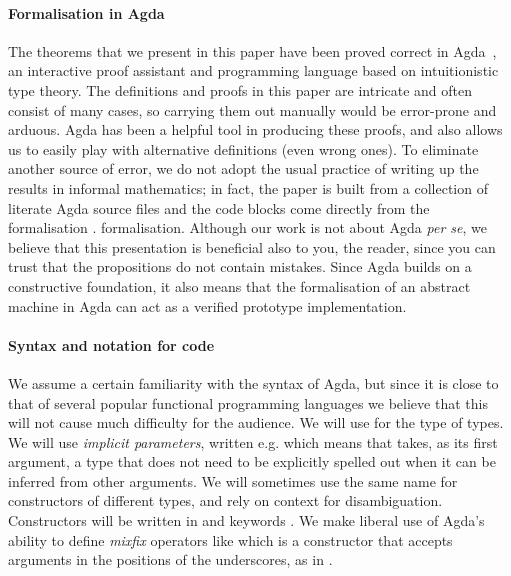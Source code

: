 \documentclass{article}
\theoremstyle{definition}
\newcommand{\Conid}[1]{\mathit{#1}}
\newcommand{\Varid}[1]{\mathit{#1}}
\renewcommand\Varid[1]{\mathord{\textsf{#1}}}
\let\Conid\Varid
\newcommand\MyConid[1]{\mathord{\textsf{\textbf{#1}}}}
\renewcommand\Varid[1]{\textsf{#1}}
\newcommand{\dummy}{\Varid{\_}}
\begin{document}
\paragraph*{Formalisation in Agda}
The theorems that we present in this paper have been proved correct in
Agda~\cite{norell:thesis}, an interactive proof assistant and programming
language based on intuitionistic type theory.  The definitions and proofs in
this paper are intricate and often consist of many cases, so carrying them out manually would
be error-prone and arduous.  Agda has been a helpful tool in producing these
proofs, and also allows us to easily play with alternative definitions (even wrong
ones). To eliminate another source of error, we do not adopt the usual practice
of writing up the results in informal mathematics; in fact, the paper is built
from a collection of literate Agda source files and the code blocks come
directly from the
\ifnotfullversion
formalisation \cite{SourceCode}.
\else
formalisation.
\fi
Although our work is not
about Agda \emph{per se}, we believe that this presentation is beneficial also
to you, the reader, since you can trust that the propositions do not contain
mistakes.
Since Agda builds on a constructive foundation, it also means that the
formalisation of an abstract machine in Agda can act as a verified prototype
implementation.
\iffullversion
\paragraph*{Syntax and notation for code}
We assume a certain familiarity with the syntax of Agda, but since it is close
to that of several popular functional programming languages we believe that
this will not cause much difficulty for the audience.
We will use {\textsmaller[.5]{\ensuremath{\star}}} for the type of types.
We will use \emph{implicit parameters}, written e.g. {\textsmaller[.5]{\ensuremath{\Varid{f}\;\mathbin{:}\;\{\mskip1.5mu \Conid{A}\;\mathbin{:}\;\star\mskip1.5mu\}\;\Varid{→}\;\Varid{...}}}}
which means that {\textsmaller[.5]{\ensuremath{\Varid{f}}}} takes, as its first argument, a type {\textsmaller[.5]{\ensuremath{\Conid{A}}}} that does not
need to be explicitly spelled out when it can be inferred from other
arguments.
We will sometimes use the same name for constructors of different types, and
rely on context for disambiguation.
Constructors will be written in  and keywords .
We make liberal use of Agda's ability to define \emph{mixfix} operators like
{\textsmaller[.5]{\ensuremath{{\MyConid{if0}\dummy\MyConid{then}\dummy\MyConid{else}\dummy}}}} which is a constructor that accepts arguments
in the positions of the underscores, as in {\textsmaller[.5]{\ensuremath{\MyConid{if0}\;\Varid{b}\;\MyConid{then}\;\Varid{t}\;\MyConid{else}\;\Varid{f}}}}.
\fi
\end{document}
